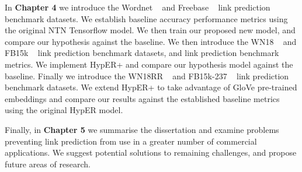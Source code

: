 \noindent In \textbf{Chapter 4} we introduce the Wordnet \unskip ~\citep{miller1995wordnet} and Freebase \unskip ~\citep{bollacker2008freebase} link prediction benchmark datasets. We establish baseline accuracy performance metrics using the original NTN Tensorflow model. We then train our proposed new model, and compare our hypothesis against the baseline. We then introduce the WN18 \unskip ~\citep{bordes2014semantic} and FB15k \unskip ~\citep{bordes2013translating} link prediction benchmark datasets, and link prediction benchmark metrics. We implement HypER+ and compare our hypothesis model against the baseline. Finally we introduce the WN18RR \unskip ~\citep{dettmers2018convolutional} and FB15k-237 \unskip ~\citep{toutanova2015observed} link prediction benchmark datasets. We extend HypER+ to take advantage of GloVe pre-trained embeddings and compare our results against the established baseline metrics using the original HypER model. \par

\noindent Finally, in \textbf{Chapter 5} we summarise the dissertation and examine problems preventing link prediction from use in a greater number of commercial applications. We suggest potential solutions to remaining challenges, and propose future areas of research.

